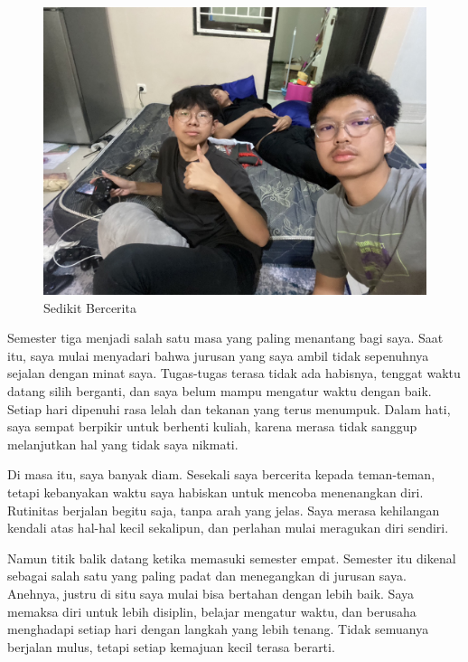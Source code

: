 \documentclass[
  letterpaper,
  DIV=11,
  numbers=noendperiod]{scrreprt}
\begin{document}
\begin{figure}[H]

{\centering \includegraphics[width=9.5\linewidth,height=\textheight,keepaspectratio]{My_Stories_for_You/../images/esa2.jpg}

}

\caption{Sedikit Bercerita}

\end{figure}%

Semester tiga menjadi salah satu masa yang paling menantang bagi saya.
Saat itu, saya mulai menyadari bahwa jurusan yang saya ambil tidak
sepenuhnya sejalan dengan minat saya. Tugas-tugas terasa tidak ada
habisnya, tenggat waktu datang silih berganti, dan saya belum mampu
mengatur waktu dengan baik. Setiap hari dipenuhi rasa lelah dan tekanan
yang terus menumpuk. Dalam hati, saya sempat berpikir untuk berhenti
kuliah, karena merasa tidak sanggup melanjutkan hal yang tidak saya
nikmati.

Di masa itu, saya banyak diam. Sesekali saya bercerita kepada
teman-teman, tetapi kebanyakan waktu saya habiskan untuk mencoba
menenangkan diri. Rutinitas berjalan begitu saja, tanpa arah yang jelas.
Saya merasa kehilangan kendali atas hal-hal kecil sekalipun, dan
perlahan mulai meragukan diri sendiri.

Namun titik balik datang ketika memasuki semester empat. Semester itu
dikenal sebagai salah satu yang paling padat dan menegangkan di jurusan
saya. Anehnya, justru di situ saya mulai bisa bertahan dengan lebih
baik. Saya memaksa diri untuk lebih disiplin, belajar mengatur waktu,
dan berusaha menghadapi setiap hari dengan langkah yang lebih tenang.
Tidak semuanya berjalan mulus, tetapi setiap kemajuan kecil terasa
berarti.
\end{document}
